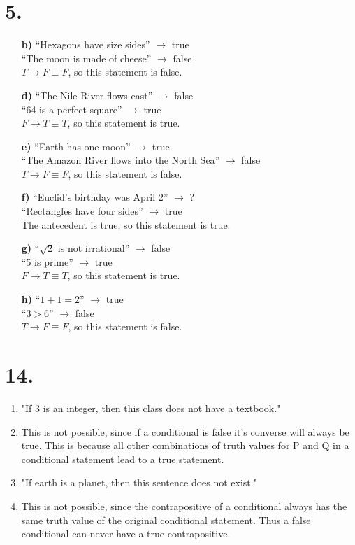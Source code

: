 \documentclass[12pt,letterpaper]{article}
\begin{document}
\newpage
\section*{5.}
\begin{enumerate}
	\item[\textbf{b)}]
		``Hexagons have size sides'' $\rightarrow$ true\\
		``The moon is made of cheese'' $\rightarrow$ false\\
		$T \rightarrow F \equiv F$, so this statement is false.
	\item[\textbf{d)}]
		``The Nile River flows east'' $\rightarrow$ false\\
		``64 is a perfect square'' $\rightarrow$ true\\
		$F \rightarrow T \equiv T$, so this statement is true. 
	\item[\textbf{e)}]
		``Earth has one moon'' $\rightarrow$ true\\
		``The Amazon River flows into the North Sea'' $\rightarrow$ false\\
		$T \rightarrow F \equiv F$, so this statement is false.  
	\item[\textbf{f)}]
		``Euclid's birthday was April 2'' $\rightarrow$ ?\\
		``Rectangles have four sides'' $\rightarrow$ true\\
		The antecedent is true, so this statement is true. 
	\item[\textbf{g)}]
		``$\sqrt{2}$ is not irrational'' $\rightarrow$ false\\
		``5 is prime'' $\rightarrow$ true\\
		$F \rightarrow T \equiv T$, so this statement is true. 
	\item[\textbf{h)}]
		``$1+1=2$'' $\rightarrow$ true\\
		``$3 > 6$'' $\rightarrow$ false\\
		$T \rightarrow F \equiv F$, so this statement is false. 
\end{enumerate}


\section*{14.}
\begin{enumerate}[label= \textbf{\alph*)}]
	\item "If 3 is an integer, then this class does not have a textbook."
	\item This is not possible, since if a conditional is false it's converse
		will always be true. This is because all other combinations of truth values
		for P and Q in a conditional statement lead to a true statement.
	\item "If earth is a planet, then this sentence does not exist."
	\item This is not possible, since the contrapositive of a conditional always
		has the same truth value of the original conditional statement. Thus a
		false conditional can never have a true contrapositive.
\end{enumerate}
\end{document}
